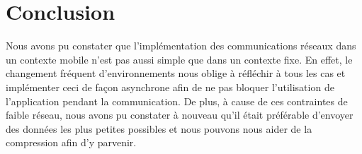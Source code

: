 \documentclass[a4paper]{article}
\begin{document}
\section{Conclusion}

Nous avons pu constater que l'implémentation des communications réseaux dans un contexte mobile n'est pas aussi simple que dans un contexte fixe. En effet, le changement fréquent d'environnements nous oblige à réfléchir à tous les cas et implémenter ceci de façon asynchrone afin de ne pas bloquer l'utilisation de l'application pendant la communication. De plus, à cause de ces contraintes de faible réseau, nous avons pu constater à nouveau qu'il était préférable d'envoyer des données les plus petites possibles et nous pouvons nous aider de la compression afin d'y parvenir.
\end{document}
